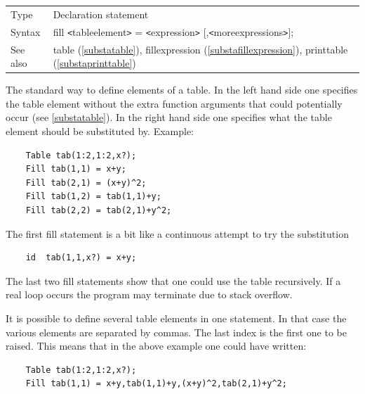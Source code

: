 \noindent \begin{tabular}{ll}
Type & Declaration statement\\
Syntax & fill {\tt<}tableelement{\tt>} = {\tt<}expression{\tt>} [,{\tt<}moreexpressions{\tt>}];
\\ See also & table (\ref{substatable}), 
                fillexpression (\ref{substafillexpression}),
                printtable (\ref{substaprinttable})
\end{tabular} \vspace{4mm}

\noindent The standard way to define elements of a 
table. In the left hand 
side one specifies the table element without the extra function arguments 
that could potentially occur (see \ref{substatable}). In the right hand 
side one specifies what the table element should be substituted by. 
Example:
\begin{verbatim}
    Table tab(1:2,1:2,x?);
    Fill tab(1,1) = x+y;
    Fill tab(2,1) = (x+y)^2;
    Fill tab(1,2) = tab(1,1)+y;
    Fill tab(2,2) = tab(2,1)+y^2;
\end{verbatim}
The first fill statement is a bit like a continuous attempt to try the 
substitution
\begin{verbatim}
    id  tab(1,1,x?) = x+y;
\end{verbatim}
The last two fill statements show that one could use the table 
recursively. 
If a real loop occurs the program may terminate due to
stack overflow.

\noindent It is possible to define several table elements in one statement. 
In that case the various elements are separated by commas. The last index 
is the first one to be raised. This means that in the above example one 
could have written:
\begin{verbatim}
    Table tab(1:2,1:2,x?);
    Fill tab(1,1) = x+y,tab(1,1)+y,(x+y)^2,tab(2,1)+y^2;
\end{verbatim}\vspace{10mm}

